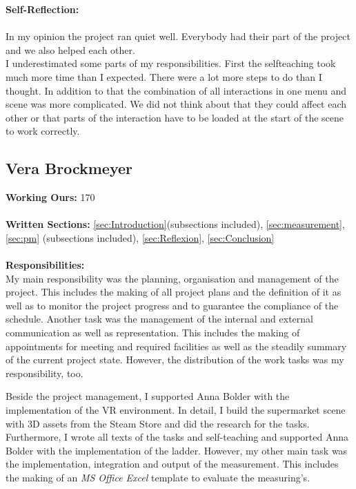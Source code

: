 \textbf{Self-Reflection:}\\ \\
In my opinion the project ran quiet well. Everybody had their part of the project and we also helped each other.\\
I underestimated some parts of my responsibilities. First the selfteaching took much more time than I expected. There were a lot more steps to do than I thought. In addition to that the combination of all interactions in one menu and scene was more complicated. We did not think about that they could affect each other or that parts of the interaction have to be loaded at the start of the scene to work correctly.\\

\newpage

\newpage
\subsection{Vera Brockmeyer} \label{sec:SAVera}


\textbf{Working Ours:} 170 \\ \\
\textbf{Written Sections: }\ref{sec:Introduction}(subsections included),  \ref{sec:measurement}, \ref{sec:pm} (subsections included), \ref{sec:Reflexion}, \ref{sec:Conclusion} \\ \\
\textbf{Responsibilities:}\\ 
My main responsibility was the planning, organisation and management of the project. This includes the making of all project plans and the definition of it as well as to monitor the project progress and to guarantee the compliance of the schedule. Another task was the management of the internal and external communication as well as representation. This includes the making of appointments for meeting and required facilities as well as the steadily summary of the current project state. However, the distribution of the work tasks was my responsibility, too.

Beside the project management, I supported Anna Bolder with the implementation of the VR environment. In detail, I build the supermarket scene with 3D assets from the Steam Store and did the research for the tasks. Furthermore, I wrote all texts of the tasks and self-teaching and supported Anna Bolder with the implementation of the ladder. However, my other main task was the implementation, integration and output of the measurement. This includes the making of an \textit{MS Office Excel} template to evaluate the measuring's.


